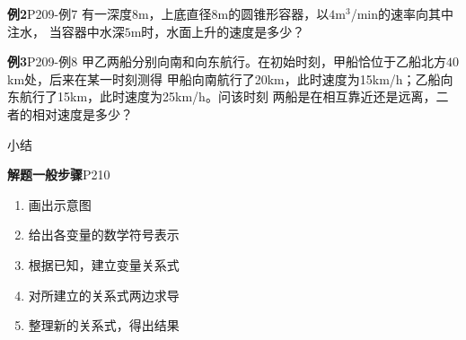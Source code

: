 \begin{frame}
	\linespread{1.5}
	\begin{exampleblock}{{\bf 例2}\hfill P209-例7}
		有一深度$8$m，上底直径$8$m的圆锥形容器，以$4$m$^3$/min的速率向其中注水，
		当容器中水深$5$m时，水面上升的速度是多少？
	\end{exampleblock}
\end{frame}

\begin{frame}
	\linespread{1.5}
	\begin{exampleblock}{{\bf 例3}\hfill P209-例8}
		甲乙两船分别向南和向东航行。在初始时刻，甲船恰位于乙船北方$40$km处，后来在某一时刻测得
		甲船向南航行了20km，此时速度为15km/h；乙船向东航行了15km，此时速度为25km/h。问该时刻
		两船是在相互靠近还是远离，二者的相对速度是多少？
	\end{exampleblock}
\end{frame}


\begin{frame}[<+->]{小结}
	\linespread{1.6}
	\begin{block}{{\bf 解题一般步骤}\hfill P210}
		\begin{enumerate}
  		  \item {}画出示意图
		  \item {}给出各变量的数学符号表示
		  \item {}根据已知，建立变量关系式
		  \item {}对所建立的关系式两边求导
		  \item {}整理新的关系式，得出结果
		\end{enumerate}
	\end{block}
\end{frame}



